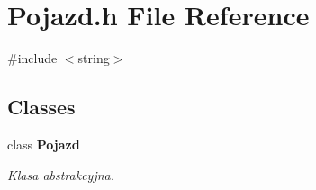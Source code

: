 \section{Pojazd.\+h File Reference}
\label{_pojazd_8h}
{\ttfamily \#include $<$string$>$}\newline
\subsection*{Classes}
\begin{DoxyCompactItemize}
\item 
class \textbf{ Pojazd}
\begin{DoxyCompactList}\small\item\em Klasa abstrakcyjna. \end{DoxyCompactList}\end{DoxyCompactItemize}
